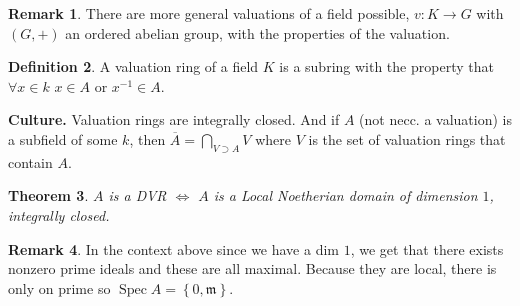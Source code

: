 \documentclass[11pt,a4paper]{article}
\theoremstyle{definition}
\newtheorem{definition}{Definition}[section]
\newtheorem{remark}[definition]{Remark}
\theoremstyle{plain}
\newtheorem{theorem}[definition]{Theorem}
\theoremstyle{remark}
\renewcommand{\set}[1]{\left\{ #1 \right\}}
\newcommand{\Spec}{\operatorname{Spec}}
\begin{document}
\begin{remark}
    There are more general valuations of a field possible, $v \colon K \to G$ with $(G, +)$ an ordered abelian group, with the properties of the valuation.
\end{remark}

\begin{definition}
    A valuation ring of a field $K$ is a subring with the property that $\forall x \in k$ $x \in A$ or $x^{-1} \in A$.
\end{definition}

\textbf{Culture.} Valuation rings are integrally closed. And if $A$ (not necc. a valuation) is a subfield of some $k$, then $\overline{A} = \bigcap_{V \supset A} V$ where 
$V$ is the set of valuation rings that contain $A$.

\begin{theorem}
    $A$ is a DVR $\iff$ $A$ is a Local Noetherian domain of dimension $1$, integrally closed.
\end{theorem}

\begin{remark}
    In the context above since we have a dim $1$, we get that there exists nonzero prime ideals and these are all maximal. Because they are local, 
    there is only on prime so $\Spec A = \set{0, \mathfrak{m}}$. 
\end{remark}
\end{document}
